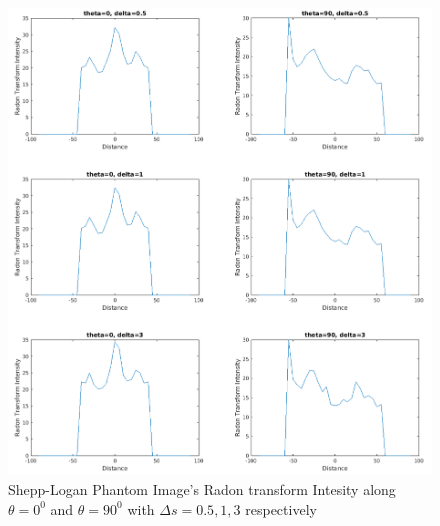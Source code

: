 \documentclass[11pt]{article}
\begin{document}
\begin{figure}[h]
\centering
\includegraphics[scale=0.4]{c2}
\caption{Shepp-Logan Phantom Image's Radon transform Intesity along $\theta=0^{0} $ and $\theta=90^{0} $ with $\Delta s = 0.5,1,3$ respectively}
\end{figure}
\end{document}

